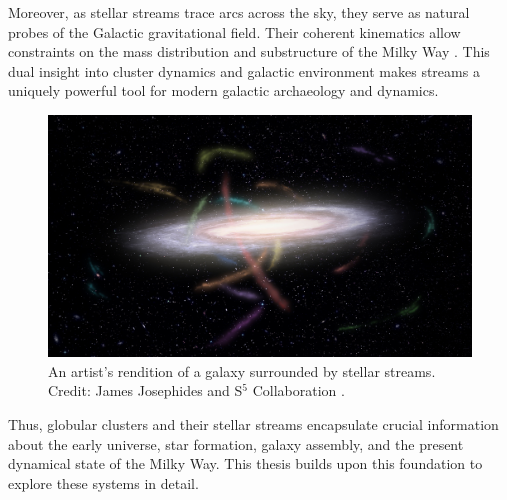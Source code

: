 Moreover, as stellar streams trace arcs across the sky, they serve as natural probes of the Galactic gravitational field. Their coherent kinematics allow constraints on the mass distribution and substructure of the Milky Way \citep{2011MNRAS.417..198V,2023ApJ...954..195N}. This dual insight into cluster dynamics and galactic environment makes streams a uniquely powerful tool for modern galactic archaeology and dynamics.

\begin{figure}
    \centering
    \includegraphics[width=\linewidth]{images/S5MilkywayStreams.jpg}
    \caption{An artist's rendition of a galaxy surrounded by stellar streams. Credit: James Josephides and S$^5$ Collaboration \citep{2019MNRAS.490.3508L}.}
    \label{fig:S5MilkywayStreams}
\end{figure}

Thus, globular clusters and their stellar streams encapsulate crucial information about the early universe, star formation, galaxy assembly, and the present dynamical state of the Milky Way. This thesis builds upon this foundation to explore these systems in detail.





